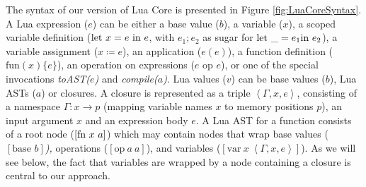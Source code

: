 \documentclass[english]{llncs}
\begin{document}
The syntax of our version of Lua Core is presented in Figure \ref{fig:LuaCoreSyntax}.
A Lua expression ($e$) can be either a base value ($b$), a variable
($x$), a scoped variable definition ($\mbox{let \ensuremath{x=e}\ in\ \ensuremath{e}}$,
with $e_{1};e_{2}$ as sugar for $\mbox{let \ensuremath{\_=e_{1}}in \ensuremath{e_{2}}}$),
a variable assignment ($x\coloneqq e$), an application ($e(e)$),
a function definition ($\mbox{fun}(x)\{e\}$), an operation on expressions
($e\mbox{ op }e$), or one of the special invocations \emph{toAST($e$)}
and \emph{compile($a$)}. Lua values ($v$) can be base values ($b$),
Lua ASTs ($a$) or closures. A closure is represented as a triple
$\left\langle \Gamma,x,e\right\rangle $, consisting of a namespace
$\Gamma:x\rightarrow p$ (mapping variable names $x$ to memory positions
$p$), an input argument $x$ and an expression body $e$. A Lua AST
for a function consists of a root node ($[\mbox{fn\ \ensuremath{x}\ \ensuremath{a}}]$)
which may contain nodes that wrap base values\emph{ }($[\mbox{base }b]$\emph{),
}operations ($[\mbox{op}\ a\ a]$), and variables ($[\mbox{var}\ x\ \left\langle \Gamma,x,e\right\rangle ]$).
As we will see below, the fact that variables are wrapped by a node
containing a closure is central to our approach.
\end{document}
